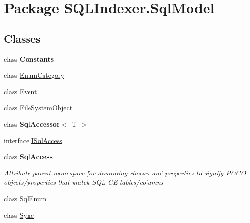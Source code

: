 \hypertarget{namespace_s_q_l_indexer_1_1_sql_model}{\section{Package S\-Q\-L\-Indexer.\-Sql\-Model}
\label{namespace_s_q_l_indexer_1_1_sql_model}
}
\subsection*{Classes}
\begin{DoxyCompactItemize}
\item 
class {\bfseries Constants}
\item 
class \hyperlink{class_s_q_l_indexer_1_1_sql_model_1_1_enum_category}{Enum\-Category}
\item 
class \hyperlink{class_s_q_l_indexer_1_1_sql_model_1_1_event}{Event}
\item 
class \hyperlink{class_s_q_l_indexer_1_1_sql_model_1_1_file_system_object}{File\-System\-Object}
\item 
class {\bfseries Sql\-Accessor$<$ T $>$}
\item 
interface \hyperlink{interface_s_q_l_indexer_1_1_sql_model_1_1_i_sql_access}{I\-Sql\-Access}
\item 
class {\bfseries Sql\-Access}
\begin{DoxyCompactList}\small\item\em Attribute parent namespace for decorating classes and properties to signify P\-O\-C\-O objects/properties that match S\-Q\-L C\-E tables/columns \end{DoxyCompactList}\item 
class \hyperlink{class_s_q_l_indexer_1_1_sql_model_1_1_sql_enum}{Sql\-Enum}
\item 
class \hyperlink{class_s_q_l_indexer_1_1_sql_model_1_1_sync}{Sync}
\end{DoxyCompactItemize}
